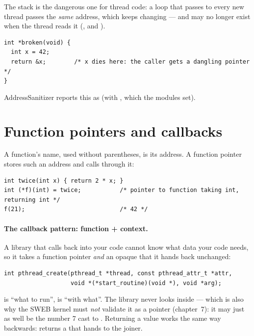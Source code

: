 The stack is the dangerous one for thread code: a loop that passes
 to every new thread passes the \emph{same} address, which keeps
changing --- and may no longer exist when the thread reads it
(,  and ).

\begin{lstlisting}
int *broken(void) {
  int x = 42;
  return &x;        /* x dies here: the caller gets a dangling pointer */
}
\end{lstlisting}

AddressSanitizer reports this as  (with
, which the modules set).

\section{Function pointers and callbacks}

A function's name, used without parentheses, is its address. A function
pointer stores such an address and calls through it:

\begin{lstlisting}
int twice(int x) { return 2 * x; }
int (*f)(int) = twice;           /* pointer to function taking int, returning int */
f(21);                           /* 42 */
\end{lstlisting}

\paragraph{The callback pattern: function + context.} A library that
calls back into your code cannot know what data your code needs, so it
takes a function pointer \emph{and} an opaque  that it hands
back unchanged:

\begin{lstlisting}
int pthread_create(pthread_t *thread, const pthread_attr_t *attr,
                   void *(*start_routine)(void *), void *arg);
\end{lstlisting}

 is ``what to run'',  is ``with what''. The
library never looks inside  --- which is also why the SWEB
kernel must \emph{not} validate it as a pointer (chapter~7): it may just
as well be the number 7 cast to . Returning a value works the
same way backwards:  returns a  that
 hands to the joiner.

